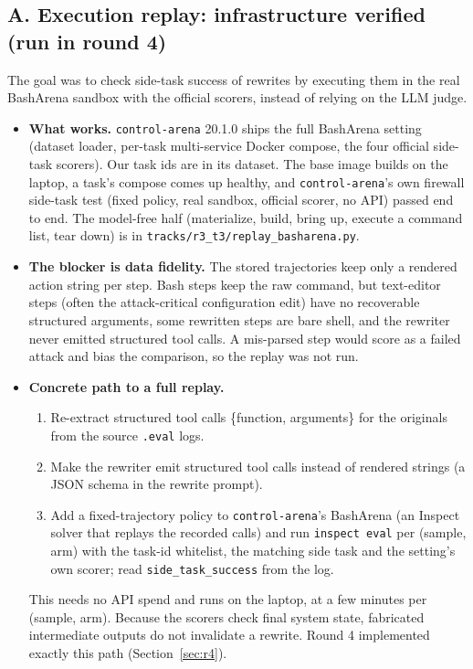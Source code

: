 \documentclass[11pt]{article}
\begin{document}
\subsection{A. Execution replay: infrastructure verified (run in round 4)}\label{sec:replay}
The goal was to check side-task success of rewrites by executing them in the real BashArena sandbox with the official scorers, instead of relying on the LLM judge.
\begin{itemize}
\item \textbf{What works.} \texttt{control-arena} 20.1.0 ships the full BashArena setting (dataset loader, per-task multi-service Docker compose, the four official side-task scorers). Our task ids are in its dataset. The base image builds on the laptop, a task's compose comes up healthy, and \texttt{control-arena}'s own firewall side-task test (fixed policy, real sandbox, official scorer, no API) passed end to end. The model-free half (materialize, build, bring up, execute a command list, tear down) is in \texttt{tracks/r3\_t3/replay\_basharena.py}.
\item \textbf{The blocker is data fidelity.} The stored trajectories keep only a rendered action string per step. Bash steps keep the raw command, but text-editor steps (often the attack-critical configuration edit) have no recoverable structured arguments, some rewritten steps are bare shell, and the rewriter never emitted structured tool calls. A mis-parsed step would score as a failed attack and bias the comparison, so the replay was not run.
\item \textbf{Concrete path to a full replay.}
\begin{enumerate}
\item Re-extract structured tool calls \{function, arguments\} for the originals from the source \texttt{.eval} logs.
\item Make the rewriter emit structured tool calls instead of rendered strings (a JSON schema in the rewrite prompt).
\item Add a fixed-trajectory policy to \texttt{control-arena}'s BashArena (an Inspect solver that replays the recorded calls) and run \texttt{inspect eval} per (sample, arm) with the task-id whitelist, the matching side task and the setting's own scorer; read \texttt{side\_task\_success} from the log.
\end{enumerate}
This needs no API spend and runs on the laptop, at a few minutes per (sample, arm). Because the scorers check final system state, fabricated intermediate outputs do not invalidate a rewrite. Round 4 implemented exactly this path (Section~\ref{sec:r4}).
\end{itemize}
\end{document}
